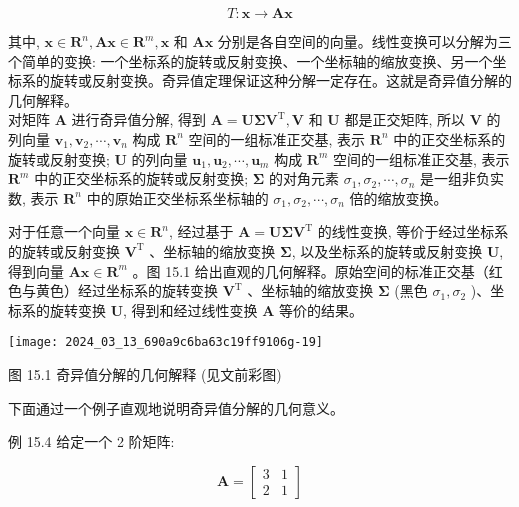 \documentclass[10pt]{article}
\begin{document}
$$
T: \boldsymbol{x} \rightarrow \boldsymbol{A} \boldsymbol{x}
$$

其中, $\boldsymbol{x} \in \boldsymbol{R}^{n}, \boldsymbol{A x} \in \boldsymbol{R}^{m}, \boldsymbol{x}$ 和 $\boldsymbol{A x}$ 分别是各自空间的向量。线性变换可以分解为三个简单的变换: 一个坐标系的旋转或反射变换、一个坐标轴的缩放变换、另一个坐标系的旋转或反射变换。奇异值定理保证这种分解一定存在。这就是奇异值分解的几何解释。\\
对矩阵 $\boldsymbol{A}$ 进行奇异值分解, 得到 $\boldsymbol{A}=\boldsymbol{U} \boldsymbol{\Sigma} \boldsymbol{V}^{\mathrm{T}}, \boldsymbol{V}$ 和 $\boldsymbol{U}$ 都是正交矩阵, 所以 $\boldsymbol{V}$ 的列向量 $\boldsymbol{v}_{1}, \boldsymbol{v}_{2}, \cdots, \boldsymbol{v}_{n}$ 构成 $\boldsymbol{R}^{n}$ 空间的一组标准正交基, 表示 $\boldsymbol{R}^{n}$ 中的正交坐标系的旋转或反射变换; $\boldsymbol{U}$ 的列向量 $\boldsymbol{u}_{1}, \boldsymbol{u}_{2}, \cdots, \boldsymbol{u}_{m}$ 构成 $\boldsymbol{R}^{m}$ 空间的一组标准正交基, 表示 $\boldsymbol{R}^{m}$ 中的正交坐标系的旋转或反射变换; $\boldsymbol{\Sigma}$ 的对角元素 $\sigma_{1}, \sigma_{2}, \cdots, \sigma_{n}$ 是一组非负实数, 表示 $\boldsymbol{R}^{n}$ 中的原始正交坐标系坐标轴的 $\sigma_{1}, \sigma_{2}, \cdots, \sigma_{n}$ 倍的缩放变换。

对于任意一个向量 $\boldsymbol{x} \in \boldsymbol{R}^{n}$, 经过基于 $\boldsymbol{A}=\boldsymbol{U} \boldsymbol{\Sigma} \boldsymbol{V}^{\mathrm{T}}$ 的线性变换, 等价于经过坐标系的旋转或反射变换 $\boldsymbol{V}^{\mathrm{T}}$ 、坐标轴的缩放变换 $\boldsymbol{\Sigma}$, 以及坐标系的旋转或反射变换 $\boldsymbol{U}$, 得到向量 $\boldsymbol{A x} \in \boldsymbol{R}^{m}$ 。图 15.1 给出直观的几何解释。原始空间的标准正交基（红色与黄色）经过坐标系的旋转变换 $\boldsymbol{V}^{\mathrm{T}}$ 、坐标轴的缩放变换 $\boldsymbol{\Sigma}$ (黑色 $\sigma_{1}, \sigma_{2}$ )、坐标系的旋转变换 $\boldsymbol{U}$, 得到和经过线性变换 $\boldsymbol{A}$ 等价的结果。

\begin{center}
\texttt{[image: 2024\_03\_13\_690a9c6ba63c19ff9106g-19]}
\end{center}

图 15.1 奇异值分解的几何解释 (见文前彩图)

下面通过一个例子直观地说明奇异值分解的几何意义。

例 15.4 给定一个 2 阶矩阵:

$$
\boldsymbol{A}=\left[\begin{array}{ll}
3 & 1 \\
2 & 1
\end{array}\right]
$$
\end{document}
